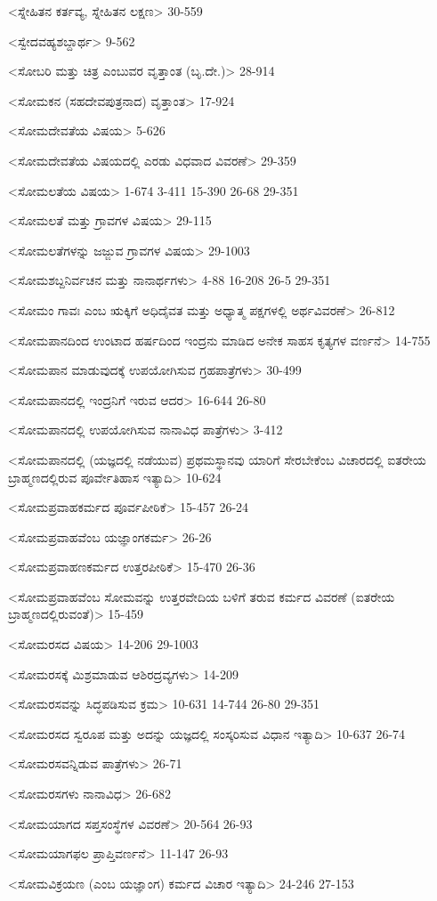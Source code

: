 <ಸ್ನೇಹಿತನ ಕರ್ತವ್ಯ, ಸ್ನೇಹಿತನ ಲಕ್ಷಣ>
30-559

<ಸ್ವೇದವಹ್ಯಶಬ್ದಾರ್ಥ>
9-562

<ಸೋಬರಿ ಮತ್ತು ಚಿತ್ರ ಎಂಬುವರ ವೃತ್ತಾಂತ (ಬೃ.ದೇ.)>
28-914

<ಸೋಮಕನ (ಸಹದೇವಪುತ್ರನಾದ) ವೃತ್ತಾಂತ>
17-924

<ಸೋಮದೇವತೆಯ ವಿಷಯ>
5-626

<ಸೋಮದೇವತೆಯ ವಿಷಯದಲ್ಲಿ ಎರಡು ವಿಧವಾದ ವಿವರಣೆ>
29-359

<ಸೋಮಲತೆಯ ವಿಷಯ>
1-674
3-411
15-390 
26-68
29-351

<ಸೋಮಲತೆ ಮತ್ತು ಗ್ರಾವಗಳ ವಿಷಯ>
29-115

<ಸೋಮಲತೆಗಳನ್ನು ಜಜ್ಜುವ ಗ್ರಾವಗಳ ವಿಷಯ>
29-1003

<ಸೋಮಶಬ್ದನಿರ್ವಚನ ಮತ್ತು ನಾನಾರ್ಥಗಳು>
4-88 
16-208
26-5 
29-351

<ಸೋಮಂ ಗಾವಃ ಎಂಬ ಋಕ್ಕಿಗೆ ಅಧಿದೈವತ ಮತ್ತು ಅಧ್ಯಾತ್ಮ ಪಕ್ಷಗಳಲ್ಲಿ ಅರ್ಥವಿವರಣೆ>
26-812

<ಸೋಮಪಾನದಿಂದ ಉಂಟಾದ ಹರ್ಷದಿಂದ ಇಂದ್ರನು ಮಾಡಿದ ಅನೇಕ ಸಾಹಸ ಕೃತ್ಯಗಳ ವರ್ಣನೆ>
14-755

<ಸೋಮಪಾನ ಮಾಡುವುದಕ್ಕೆ ಉಪಯೋಗಿಸುವ ಗ್ರಹಪಾತ್ರೆಗಳು>
30-499

<ಸೋಮಪಾನದಲ್ಲಿ ಇಂದ್ರನಿಗೆ ಇರುವ ಆದರ>
16-644 
26-80

<ಸೋಮಪಾನದಲ್ಲಿ ಉಪಯೋಗಿಸುವ ನಾನಾವಿಧ ಪಾತ್ರೆಗಳು>
3-412

<ಸೋಮಪಾನದಲ್ಲಿ (ಯಜ್ಞದಲ್ಲಿ ನಡೆಯುವ) ಪ್ರಥಮಸ್ಥಾನವು ಯಾರಿಗೆ ಸೇರಬೇಕೆಂಬ ವಿಚಾರದಲ್ಲಿ ಐತರೇಯ ಬ್ರಾಹ್ಮಣದಲ್ಲಿರುವ ಪೂರ್ವೇತಿಹಾಸ ಇತ್ಯಾದಿ>
10-624

<ಸೋಮಪ್ರವಾಹಕರ್ಮದ ಪೂರ್ವಪೀಠಿಕೆ>
15-457 
26-24

<ಸೋಮಪ್ರವಾಹವೆಂಬ ಯಜ್ಞಾಂಗಕರ್ಮ>
26-26

<ಸೋಮಪ್ರವಾಹಣಕರ್ಮದ ಉತ್ತರಪೀಠಿಕೆ>
15-470
26-36

<ಸೋಮಪ್ರವಾಹವೆಂಬ ಸೋಮವನ್ನು ಉತ್ತರವೇದಿಯ ಬಳಿಗೆ ತರುವ ಕರ್ಮದ ವಿವರಣೆ (ಐತರೇಯ ಬ್ರಾಹ್ಮಣದಲ್ಲಿರುವಂತೆ)>
15-459

<ಸೋಮರಸದ ವಿಷಯ>
14-206 
29-1003

<ಸೋಮರಸಕ್ಕೆ ಮಿಶ್ರಮಾಡುವ ಆಶಿರದ್ರವ್ಯಗಳು>
14-209

<ಸೋಮರಸವನ್ನು ಸಿದ್ಧಪಡಿಸುವ ಕ್ರಮ>
10-631
14-744 
26-80
29-351

<ಸೋಮರಸದ ಸ್ವರೂಪ ಮತ್ತು ಅದನ್ನು ಯಜ್ಞದಲ್ಲಿ ಸಂಸ್ಕರಿಸುವ ವಿಧಾನ ಇತ್ಯಾದಿ>
10-637 
26-74

<ಸೋಮರಸವನ್ನಿಡುವ ಪಾತ್ರೆಗಳು>
26-71

<ಸೋಮರಸಗಳು ನಾನಾವಿಧ>
26-682

<ಸೋಮಯಾಗದ ಸಪ್ತಸಂಸ್ಥೆಗಳ ವಿವರಣೆ>
20-564
26-93

<ಸೋಮಯಾಗಫಲ ಪ್ರಾಪ್ತಿವರ್ಣನೆ>
11-147
26-93

<ಸೋಮವಿಕ್ರಯಣ (ಎಂಬ ಯಜ್ಞಾಂಗ) ಕರ್ಮದ ವಿಚಾರ ಇತ್ಯಾದಿ>
24-246
27-153

